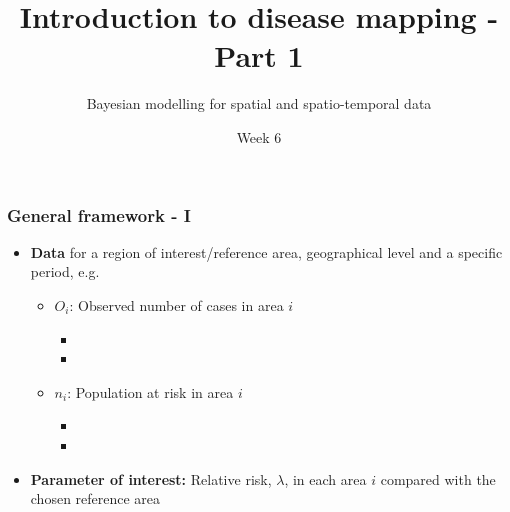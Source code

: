 \documentclass[12pt]{beamer}
\title{Introduction to disease mapping - Part 1}
\subtitle{}
\author{Bayesian modelling for spatial and spatio-temporal data}
\institute{MSc in Epidemiology}
\date{Week 6}
\begin{document}
\begin{frame}[t]
  \titlepage
\end{frame}

\begin{frame}
    \frametitle{General framework - I}
\begin{itemize}
\item \vfill \textbf{Data} for a region of interest/reference area, geographical level and a specific period, e.g. {\color{cyan}{England, ward level, 2009-2012}}
        \begin{itemize}\setlength\itemsep{\fill}
            \item  $O_i$: Observed number of cases in area $i$
            \begin{itemize}\setlength\itemsep{\fill}
              \item {\color{cyan}{Lung cancer deaths in males aged 45+}}
              \item {\color{cyan}{Congenital anomalies}}
            \end{itemize}
            \item  $n_i$: Population at risk in area $i$
            \begin{itemize}\setlength\itemsep{\fill}
              \item {\color{cyan}{Male population aged 45+}}
              \item {\color{cyan}{Live births and stillbirths}}
            \end{itemize}
        \end{itemize}

\item \textbf{Parameter of interest:} \alert{Relative risk, $\lambda$}, in each area $i$ compared with the chosen reference area
\end{itemize}
\end{frame}
\end{document}
